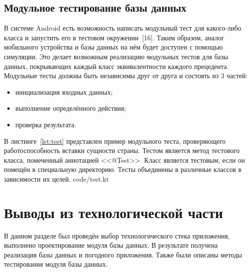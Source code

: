  \subsection{Модульное тестирование базы данных}
 В системе Android есть возможность написать модульный тест для какого-либо класса и запустить его в тестовом окружении~[16].
 Таким образом, аналог мобильного устройства и базы данных на нём будет доступен с помощью симуляции.
 Это делает возможным реализацию модульных тестов для базы данных, покрывающих каждый класс эквивалентности каждого прецедента.
 Модульные тесты должны быть независимы друг от друга и состоять из 3 частей:
 \begin{itemize}
     \item инициализация входных данных;
     \item выполнение определённого действия;
     \item проверка результата.
 \end{itemize}

В листинге~\ref{lst:test} представлен пример модульного теста, проверяющего работоспособность вставки сущности страны.
Тестом является метод тестового класса, помеченный аннотацией <<@Test>>.
Класс является тестовым, если он помещён в специальную директорию.
Тесты объединены в различные классов в зависимости их целей.
  {code/test.kt}

\section*{Выводы из технологической части}
В данном разделе был проведён выбор технологического стека приложения, выполнено проектирование модуля базы данных.
В результате получена реализация базы данных и погодного приложения.
Также были описаны методы тестирования модуля базы данных.